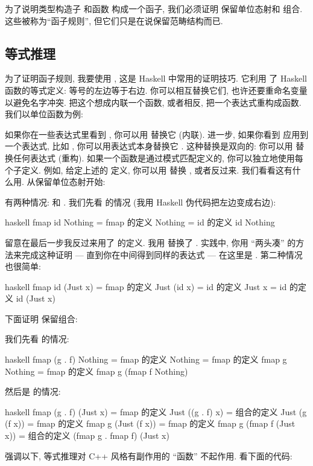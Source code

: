 为了说明类型构造子  和函数  构成一个函子, 我们必须证明  保留单位态射和
组合. 这些被称为``函子规则'', 但它们只是在说保留范畴结构而已.

\subsection{等式推理}

为了证明函子规则, 我要使用 , 这是 Haskell 中常用的证明技巧. 它利用
了 Haskell 函数的等式定义: 等号的左边等于右边. 你可以相互替换它们, 也许还要重命名变量以避免名字冲突.
把这个想成内联一个函数, 或者相反, 把一个表达式重构成函数. 我们以单位函数为例:

如果你在一些表达式里看到 , 你可以用  替换它 (内联). 进一步, 如果你看到  应用到一个表达式,
比如 , 你可以用表达式本身替换它 . 这种替换是双向的: 你可以用 
替换任何表达式  (重构). 如果一个函数是通过模式匹配定义的, 你可以独立地使用每个子定义. 例如, 给定上述的
 定义, 你可以用  替换 , 或者反过来. 我们看看这有什么用.
从保留单位态射开始:

有两种情况:  和 . 我们先看  的情况 (我用 Haskell 伪代码把左边变成右边):

\begin{snip}{haskell}
  fmap id Nothing
= { fmap 的定义 }
  Nothing
= { id 的定义}
  id Nothing
\end{snip}
留意在最后一步我反过来用了  的定义. 我用  替换了 .
实践中, 你用 ``两头凑'' 的方法来完成这种证明 --- 直到你在中间得到同样的表达式 --- 在这里是 .
第二种情况也很简单:

\begin{snip}{haskell}
  fmap id (Just x)
= { fmap 的定义 }
  Just (id x)
= { id 的定义 }
  Just x
= { id 的定义 }
  id (Just x)
\end{snip}
下面证明  保留组合:

我们先看  的情况:

\begin{snip}{haskell}
  fmap (g . f) Nothing
= { fmap 的定义 }
  Nothing
= { fmap 的定义 }
  fmap g Nothing
= { fmap 的定义 }
  fmap g (fmap f Nothing)
\end{snip}
然后是  的情况:

\begin{snip}{haskell}
  fmap (g . f) (Just x)
= { fmap 的定义 }
  Just ((g . f) x)
= { 组合的定义 }
  Just (g (f x))
= { fmap 的定义 }
  fmap g (Just (f x))
= { fmap 的定义 }
  fmap g (fmap f (Just x))
= { 组合的定义 }
  (fmap g . fmap f) (Just x)
\end{snip}
强调以下, 等式推理对 C++ 风格有副作用的 ``函数'' 不起作用. 看下面的代码:

